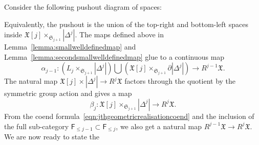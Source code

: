 \documentclass[a4paper]{amsart}
\newcommand{\fX}{\mathfrak X}
\newcommand{\lra}{\longrightarrow}
\newcommand{\fS}{\mathfrak S}
\theoremstyle{plain}
\theoremstyle{definition}
\newcommand{\catF}{\mathsf{F}}
\begin{document}
Consider the following pushout diagram of spaces:
\begin{center}
\end{center}
Equivalently, the pushout is the union of the top-right and bottom-left spaces inside $\fX[j] \times_{\fS_{j+1}} |\Delta^j|$.
The maps defined above in Lemma~\ref{lemma:smallwelldefinedmap} and Lemma~\ref{lemma:secondsmallwelldefinedmap} glue to a continuous map
\[
    \alpha_{j-1} \colon \left( L_j \times_{\fS_{j+1}} |\Delta^j|\right) \bigcup \left(\fX[j] \times_{\fS_{j+1}} \partial |\Delta^j|\right) \lra R^{j-1}\fX.
\]
The natural map $\fX[j] \times |\Delta^j| \to R^j\fX$ factors through the quotient by the symmetric group action and gives a map
\[
    \beta_j \colon \fX[j] \times_{\fS_{j+1}} |\Delta^j| \lra R^j\fX.
\]
From the coend formula~\eqref{eqn:jthgeometricrealisationcoend} and the inclusion of the full sub-category $\catF_{\leq j-1} \subset \catF_{\leq j}$, we also get a natural map $R^{j-1}\fX \to R^j\fX$. We are now ready to state the
\end{document}
